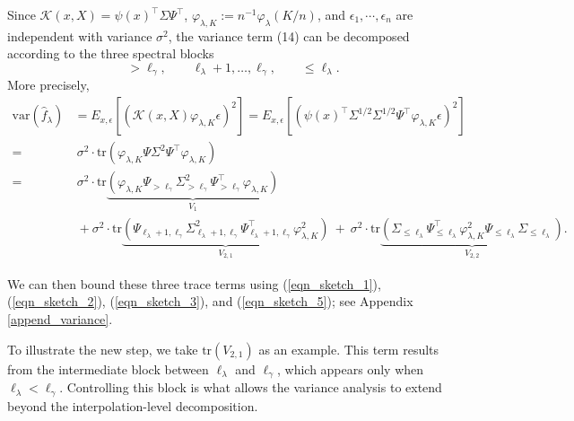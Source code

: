 \documentclass{article}
\theoremstyle{plain}
\theoremstyle{definition}
\theoremstyle{remark}
\newcommand{\reg}{\varphi_\lambda}
\begin{document}
\begin{appendix}
Since $\mathscr{K}(x,X) = \psi(x)^{\top} \Sigma \Psi^{\top}$, $\varphi_{\lambda, K}:=n^{-1}\reg(K/n)$, and $\epsilon_1, \cdots, \epsilon_n$ are independent with variance $\sigma^2$, 
the variance term (14) can be decomposed according to the three spectral blocks
\[
>\ell_\gamma,\qquad \ell_\lambda+1,\ldots,\ell_\gamma,\qquad \le \ell_\lambda.
\]
More precisely,
\begin{equation*}
    \begin{aligned}
        \mathrm{var}\left( \hat{f}_{\lambda} \right) &= E_{x, \epsilon}\left[\left(\mathscr{K}(x,X) \varphi_{\lambda, K} \epsilon \right)^2\right] = E_{x, \epsilon} \left[\left( \psi(x)^{\top} \Sigma^{1/2} \Sigma^{1/2} \Psi^{\top} \varphi_{\lambda, K} \epsilon \right)^2\right]  \\
    =&~  \sigma^{2} \cdot \mathrm{tr} \left( \varphi_{\lambda, K} \Psi \Sigma^{2} \Psi^{\top} \varphi_{\lambda, K} \right)\\
    =&~
    \sigma^{2} \cdot \mathrm{tr} \underbrace{\left(\varphi_{\lambda, K} \Psi_{> \ell_{\gamma}} \Sigma_{> \ell_{\gamma}}^{2} \Psi_{> \ell_{\gamma}}^{\top} \varphi_{\lambda, K}\right)}_{ V_{1}}\\
    &~+
    \sigma^{2} \cdot \mathrm{tr} \underbrace{\left(  \Psi_{\ell_{\lambda}+1, \ell_{\gamma}} \Sigma_{\ell_{\lambda}+1, \ell_{\gamma}}^{2} \Psi_{\ell_{\lambda}+1, \ell_{\gamma}}^{\top} \varphi_{\lambda, K}^2 \right)}_{V_{2, 1}}
    ~+~
    \sigma^{2} \cdot \mathrm{tr} \underbrace{\left(  \Sigma_{\leq \ell_{\lambda}} \Psi_{\leq \ell_{\lambda}}^{\top}  \varphi_{\lambda, K}^2 \Psi_{\leq \ell_{\lambda}} \Sigma_{\leq \ell_{\lambda}} \right)}_{V_{2, 2}}.
    \end{aligned}
\end{equation*}


We can then bound these three trace terms using (\ref{eqn_sketch_1}), (\ref{eqn_sketch_2}), (\ref{eqn_sketch_3}), and (\ref{eqn_sketch_5}); see Appendix \ref{append_variance}. 

To illustrate the new step, we take $\mathrm{tr}(V_{2,1})$ as an example. 
This term results from the intermediate block between $\ell_\lambda$ and $\ell_\gamma$, which appears only when $\ell_\lambda<\ell_\gamma$. Controlling this block is what allows the variance analysis to extend beyond the interpolation-level decomposition.



\end{appendix}
\end{document}
